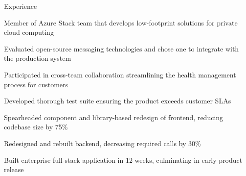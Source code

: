 \documentclass{resume} %
\begin{document}
    \begin{rSection}{Experience}

        \company{\microsoft}{\la}
                \begin{rList}
                    \item Member of Azure Stack team that develops low-footprint
                        solutions for private cloud computing
                    \item Evaluated open-source messaging technologies
                        and chose one to integrate with the production system
                    \item Participated in cross-team collaboration streamlining
                        the health management process for customers
                    \item Developed thorough test suite ensuring the product exceeds
                        customer SLAs
                \end{rList}
        \vspace{0.5em}


        \company{\lefttravel}{\la}
                \begin{rList}
                    \item Spearheaded component and library-based redesign of frontend,
                        reducing codebase size by 75\%
                    \item Redesigned and rebuilt backend, decreasing required calls by 30\%
                    \item Built enterprise full-stack application in 12 weeks, culminating in early
                        product release
                \end{rList}
        \vspace{0.5em}

    \end{rSection}

\end{document}
